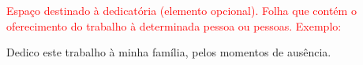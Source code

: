 \textcolor{red}{Espaço destinado à dedicatória (elemento opcional). 
Folha que contém o oferecimento do trabalho à determinada pessoa ou pessoas. 
Exemplo:}

Dedico este trabalho à minha família, pelos momentos de ausência.

